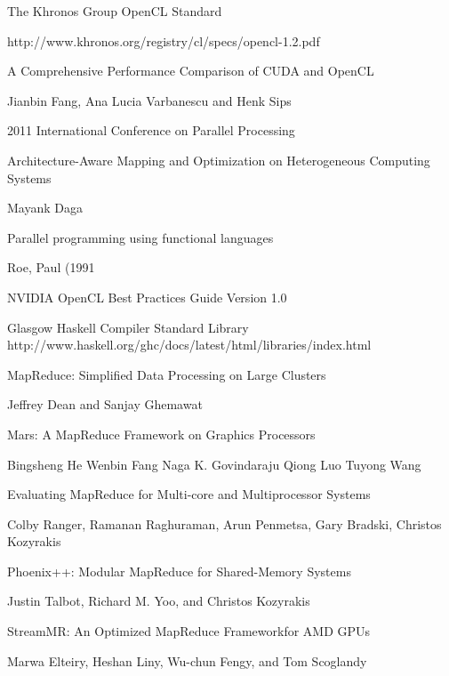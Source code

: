\documentclass[11pt,a4paper,twocolumn] {scrartcl}   %
\begin{document}
\maketitle
{}

\pagebreak{}








\begin{thebibliography}{9}

\thispagestyle{empty}
\pagestyle{empty}
    The Khronos Group OpenCL Standard

    http://www.khronos.org/registry/cl/specs/opencl-1.2.pdf

    A Comprehensive Performance Comparison of
    CUDA and OpenCL

    Jianbin Fang, Ana Lucia Varbanescu and Henk Sips

    2011 International Conference on Parallel Processing

    Architecture-Aware Mapping and Optimization on Heterogeneous Computing Systems

    Mayank Daga

    Parallel programming using functional languages

    Roe, Paul (1991

    NVIDIA OpenCL Best Practices Guide Version 1.0

    Glasgow Haskell Compiler Standard Library
    http://www.haskell.org/ghc/docs/latest/html/libraries/index.html

    MapReduce: Simplified Data Processing on Large Clusters

    Jeffrey Dean and Sanjay Ghemawat

  Mars: A MapReduce Framework on Graphics Processors

  Bingsheng He Wenbin Fang Naga K. Govindaraju Qiong Luo Tuyong Wang

  Evaluating MapReduce for Multi-core and Multiprocessor Systems

  Colby Ranger, Ramanan Raghuraman, Arun Penmetsa, Gary Bradski, Christos Kozyrakis

    Phoenix++: Modular MapReduce for Shared-Memory Systems

    Justin Talbot, Richard M. Yoo, and Christos Kozyrakis

    StreamMR: An Optimized MapReduce Frameworkfor AMD GPUs

    Marwa Elteiry, Heshan Liny, Wu-chun Fengy, and Tom Scoglandy

\thispagestyle{empty}
\pagestyle{empty}
\end{thebibliography}
\end{document}
